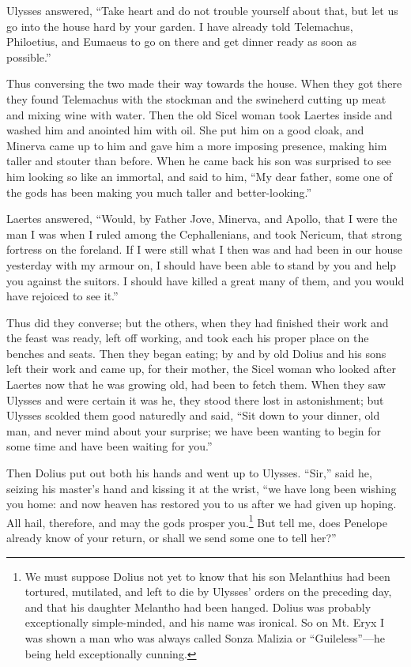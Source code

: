 Ulysses answered, “Take heart and do not trouble yourself about that, but let
us go into the house hard by your garden. I have already told Telemachus,
Philoetius, and Eumaeus to go on there and get dinner ready as soon as
possible.”

Thus conversing the two made their way towards the house. When they got there
they found Telemachus with the stockman and the swineherd cutting up meat and
mixing wine with water. Then the old Sicel woman took Laertes inside and washed
him and anointed him with oil. She put him on a good cloak, and Minerva came up
to him and gave him a more imposing presence, making him taller and stouter
than before. When he came back his son was surprised to see him looking so like
an immortal, and said to him, “My dear father, some one of the gods has been
making you much taller and better-looking.”

Laertes answered, “Would, by Father Jove, Minerva, and Apollo, that I were the
man I was when I ruled among the Cephallenians, and took Nericum, that strong
fortress on the foreland. If I were still what I then was and had been in our
house yesterday with my armour on, I should have been able to stand by you and
help you against the suitors. I should have killed a great many of them, and
you would have rejoiced to see it.”

Thus did they converse; but the others, when they had finished their work and
the feast was ready, left off working, and took each his proper place on the
benches and seats. Then they began eating; by and by old Dolius and his sons
left their work and came up, for their mother, the Sicel woman who looked after
Laertes now that he was growing old, had been to fetch them. When they saw
Ulysses and were certain it was he, they stood there lost in astonishment; but
Ulysses scolded them good naturedly and said, “Sit down to your dinner, old
man, and never mind about your surprise; we have been wanting to begin for some
time and have been waiting for you.”

Then Dolius put out both his hands and went up to Ulysses. “Sir,” said he,
seizing his master’s hand and kissing it at the wrist, “we have long been
wishing you home: and now heaven has restored you to us after we had given up
hoping. All hail, therefore, and may the gods prosper you.\footnote{We must suppose Dolius not yet to know that his son Melanthius had been
tortured, mutilated, and left to die by Ulysses’ orders on the preceding day,
and that his daughter Melantho had been hanged. Dolius was probably
exceptionally simple-minded, and his name was ironical. So on Mt. Eryx I was
shown a man who was always called Sonza Malizia or “Guileless”—he being held
exceptionally cunning.} But tell me,
does Penelope already know of your return, or shall we send some one to tell
her?”

